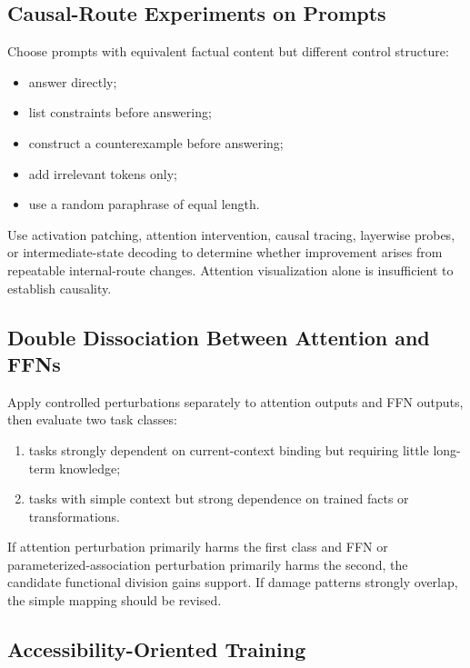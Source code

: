 \documentclass[11pt, a4paper]{article}
\begin{document}
\subsection{Causal-Route Experiments on Prompts}


Choose prompts with equivalent factual content but different control structure:


\begin{itemize}
\item answer directly;
\item list constraints before answering;
\item construct a counterexample before answering;
\item add irrelevant tokens only;
\item use a random paraphrase of equal length.
\end{itemize}


Use activation patching, attention intervention, causal tracing, layerwise probes, or intermediate-state decoding to determine whether improvement arises from repeatable internal-route changes. Attention visualization alone is insufficient to establish causality.


\subsection{Double Dissociation Between Attention and FFNs}


Apply controlled perturbations separately to attention outputs and FFN outputs, then evaluate two task classes:


\begin{enumerate}
\item tasks strongly dependent on current-context binding but requiring little long-term knowledge;
\item tasks with simple context but strong dependence on trained facts or transformations.
\end{enumerate}


If attention perturbation primarily harms the first class and FFN or parameterized-association perturbation primarily harms the second, the candidate functional division gains support. If damage patterns strongly overlap, the simple mapping should be revised.


\subsection{Accessibility-Oriented Training}
\end{document}
